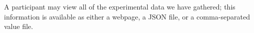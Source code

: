 A participant may view all of the experimental data we have gathered; this information is available as either a webpage, a JSON file, or a comma-separated value file.







